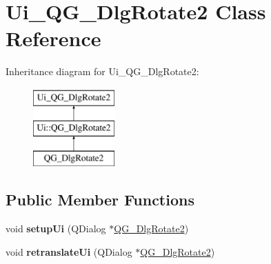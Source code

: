 \hypertarget{classUi__QG__DlgRotate2}{\section{Ui\-\_\-\-Q\-G\-\_\-\-Dlg\-Rotate2 Class Reference}
\label{classUi__QG__DlgRotate2}
}
Inheritance diagram for Ui\-\_\-\-Q\-G\-\_\-\-Dlg\-Rotate2\-:\begin{figure}[H]
\begin{center}
\leavevmode
\includegraphics[height=3.000000cm]{classUi__QG__DlgRotate2}
\end{center}
\end{figure}
\subsection*{Public Member Functions}
\begin{DoxyCompactItemize}
\item 
\hypertarget{classUi__QG__DlgRotate2_a28ecd814927cd77c9e01430c435c0096}{void {\bfseries setup\-Ui} (Q\-Dialog $\ast$\hyperlink{classQG__DlgRotate2}{Q\-G\-\_\-\-Dlg\-Rotate2})}\label{classUi__QG__DlgRotate2_a28ecd814927cd77c9e01430c435c0096}

\item 
\hypertarget{classUi__QG__DlgRotate2_af0371ea47427e2a36fe777a83d078228}{void {\bfseries retranslate\-Ui} (Q\-Dialog $\ast$\hyperlink{classQG__DlgRotate2}{Q\-G\-\_\-\-Dlg\-Rotate2})}\label{classUi__QG__DlgRotate2_af0371ea47427e2a36fe777a83d078228}

\end{DoxyCompactItemize}
